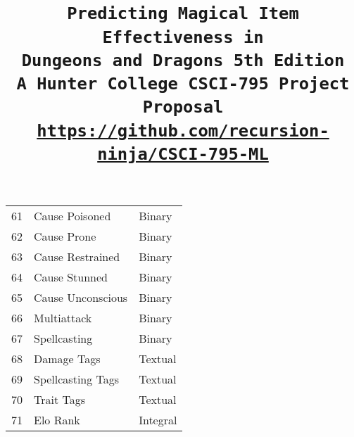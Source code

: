 \documentclass[12pt]{diazessay}
\begin{document}
\begin{table}[!htbp]
\begin{footnotesize}
\begin{minipage}[b]{0.45\linewidth}
\begin{longtable}{@{}rll@{}}
	61 & Cause Poisoned & Binary \\
	62 & Cause Prone & Binary \\
	63 & Cause Restrained & Binary \\
	64 & Cause Stunned & Binary \\
	65 & Cause Unconscious & Binary \\
	66 & Multiattack & Binary \\
	67 & Spellcasting & Binary \\
	68 & Damage Tags & Textual \\
	69 & Spellcasting Tags & Textual \\
	70 & Trait Tags & Textual \\\title{\texttt{\LARGE{Predicting Magical Item Effectiveness in \\Dungeons and Dragons 5th Edition} \\\vspace{-0.35cm} {\large A Hunter College CSCI-795 Project Proposal}\\\normalsize\url{https://github.com/recursion-ninja/CSCI-795-ML}}} %
	71 & Elo Rank & Integral \\
	\bottomrule
\end{longtable}
\end{minipage}
\end{footnotesize}

\end{table}
\end{document}
